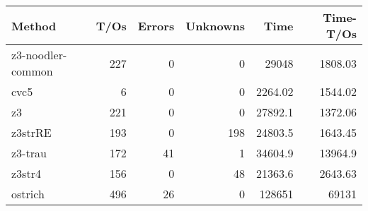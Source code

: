 \begin{tabular}{lrrrrr}
\hline
 Method            &   T/Os &   Errors &   Unknowns &      Time &   Time-T/Os \\
\hline
 z3-noodler-common &    227 &        0 &          0 &  29048    &     1808.03 \\
 cvc5              &      6 &        0 &          0 &   2264.02 &     1544.02 \\
 z3                &    221 &        0 &          0 &  27892.1  &     1372.06 \\
 z3strRE           &    193 &        0 &        198 &  24803.5  &     1643.45 \\
 z3-trau           &    172 &       41 &          1 &  34604.9  &    13964.9  \\
 z3str4            &    156 &        0 &         48 &  21363.6  &     2643.63 \\
 ostrich           &    496 &       26 &          0 & 128651    &    69131    \\
\hline
\end{tabular}
